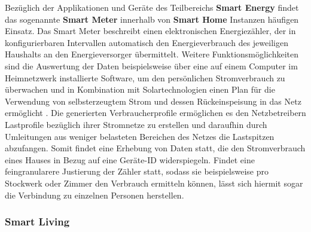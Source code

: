 Bezüglich der Applikationen und Geräte des Teilbereichs \textbf{Smart Energy} findet das sogenannte \textbf{Smart Meter} innerhalb von \textbf{Smart Home} Instanzen häufigen Einsatz. Das Smart Meter beschreibt einen elektronischen Energiezähler, der in konfigurierbaren Intervallen automatisch den Energieverbrauch des jeweiligen Haushalts an den Energieversorger übermittelt. 
Weitere Funktionsmöglichkeiten sind die Auswertung der Daten beispielsweise über eine auf einem Computer im Heimnetzwerk installierte Software, um den persönlichen Stromverbrauch zu überwachen und in Kombination mit Solartechnologien einen Plan für die Verwendung von selbsterzeugtem Strom und dessen Rückeinspeisung in das Netz ermöglicht \cite{fox2010smart}. 
Die generierten Verbraucherprofile ermöglichen es den Netzbetreibern Lastprofile bezüglich ihrer Stromnetze zu erstellen und daraufhin durch Umleitungen aus weniger belasteten Bereichen des Netzes die Lastspitzen abzufangen. 
Somit findet eine Erhebung von Daten statt, die den Stromverbrauch eines Hauses in Bezug auf eine Geräte-ID widerspiegeln. Findet eine feingranularere Justierung der Zähler statt, sodass sie beispielsweise pro Stockwerk oder Zimmer den Verbrauch ermitteln können, lässt sich hiermit sogar die Verbindung zu einzelnen Personen herstellen.

\subsubsection{Smart Living}
\label{sec:Analyse der Datenerhebung:ssec:Smart City:sssec:Smart Living}


